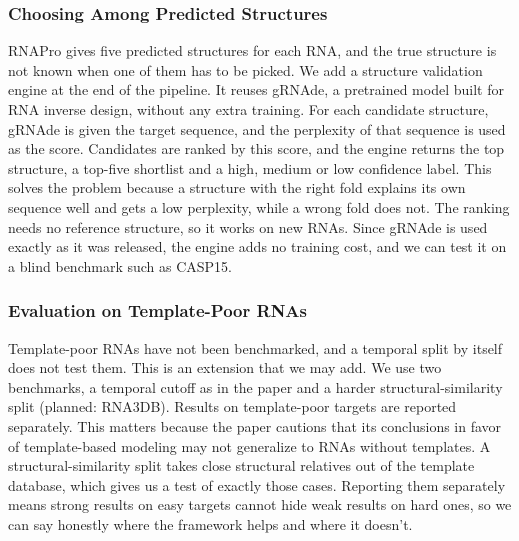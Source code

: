 \documentclass{FastFyp}
\begin{document}
\subsubsection{Choosing Among Predicted Structures}
RNAPro gives five predicted structures for each RNA, and the true structure is not known when one of them has to be picked. We add a structure validation engine at the end of the pipeline. It reuses gRNAde, a pretrained model built for RNA inverse design, without any extra training. For each candidate structure, gRNAde is given the target sequence, and the perplexity of that sequence is used as the score. Candidates are ranked by this score, and the engine returns the top structure, a top-five shortlist and a high, medium or low confidence label. This solves the problem because a structure with the right fold explains its own sequence well and gets a low perplexity, while a wrong fold does not. The ranking needs no reference structure, so it works on new RNAs. Since gRNAde is used exactly as it was released, the engine adds no training cost, and we can test it on a blind benchmark such as CASP15.

\subsubsection{Evaluation on Template-Poor RNAs}
Template-poor RNAs have not been benchmarked, and a temporal split by itself does not test them. This is an extension that we may add. We use two benchmarks, a temporal cutoff as in the paper and a harder structural-similarity split (planned: RNA3DB). Results on template-poor targets are reported separately. This matters because the paper cautions that its conclusions in favor of template-based modeling may not generalize to RNAs without templates. A structural-similarity split takes close structural relatives out of the template database, which gives us a test of exactly those cases. Reporting them separately means strong results on easy targets cannot hide weak results on hard ones, so we can say honestly where the framework helps and where it doesn't.
\end{document}

